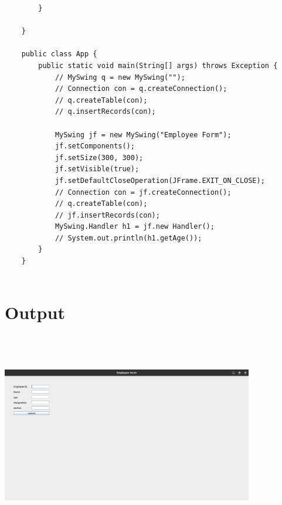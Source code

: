 \documentclass{article}
\begin{document}
\begin{lstlisting}
        }
    
    }
    
    public class App {
        public static void main(String[] args) throws Exception {
            // MySwing q = new MySwing("");
            // Connection con = q.createConnection();
            // q.createTable(con);
            // q.insertRecords(con);
    
            MySwing jf = new MySwing("Employee Form");
            jf.setComponents();
            jf.setSize(300, 300);
            jf.setVisible(true);
            jf.setDefaultCloseOperation(JFrame.EXIT_ON_CLOSE);
            // Connection con = jf.createConnection();
            // q.createTable(con);
            // jf.insertRecords(con);
            MySwing.Handler h1 = jf.new Handler();
            // System.out.println(h1.getAge());
        }
    }
    
\end{lstlisting}

\section*{Output}
\includegraphics[width=11cm, height=9cm]{./images/01.png}
\end{document}
